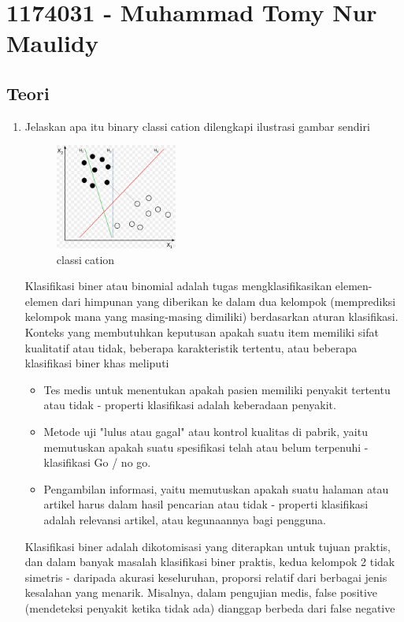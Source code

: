 \section{1174031 - Muhammad Tomy Nur Maulidy}
\subsection{Teori}
\begin{enumerate}
	\item Jelaskan apa itu binary classication dilengkapi ilustrasi gambar sendiri
	\hfill\break
	\begin{figure}[H]
		\includegraphics[width=4cm]{figures/1174031/2/1.jpg}
		\centering
		\caption{classication}
	\end{figure}
	Klasifikasi biner atau binomial adalah tugas mengklasifikasikan elemen-elemen dari himpunan yang diberikan ke dalam dua kelompok (memprediksi kelompok mana yang masing-masing dimiliki) berdasarkan aturan klasifikasi. 
	Konteks yang membutuhkan keputusan apakah suatu item memiliki sifat kualitatif atau tidak, beberapa karakteristik tertentu, atau beberapa klasifikasi biner khas meliputi
	\begin{itemize}
		\item Tes medis untuk menentukan apakah pasien memiliki penyakit tertentu atau tidak - properti klasifikasi adalah keberadaan penyakit.
		\item Metode uji "lulus atau gagal" atau kontrol kualitas di pabrik, yaitu memutuskan apakah suatu spesifikasi telah atau belum terpenuhi - klasifikasi Go / no go.
		\item Pengambilan informasi, yaitu memutuskan apakah suatu halaman atau artikel harus dalam hasil pencarian atau tidak - properti klasifikasi adalah relevansi artikel, atau kegunaannya bagi pengguna.
	\end{itemize}
	\hfill\break
	Klasifikasi biner adalah dikotomisasi yang diterapkan untuk tujuan praktis, dan dalam banyak masalah klasifikasi biner praktis, 
	kedua kelompok 2 tidak simetris - daripada akurasi keseluruhan, proporsi relatif dari berbagai jenis kesalahan yang menarik. 
	Misalnya, dalam pengujian medis, false positive (mendeteksi penyakit ketika tidak ada) dianggap berbeda dari false negative 

\end{enumerate}

